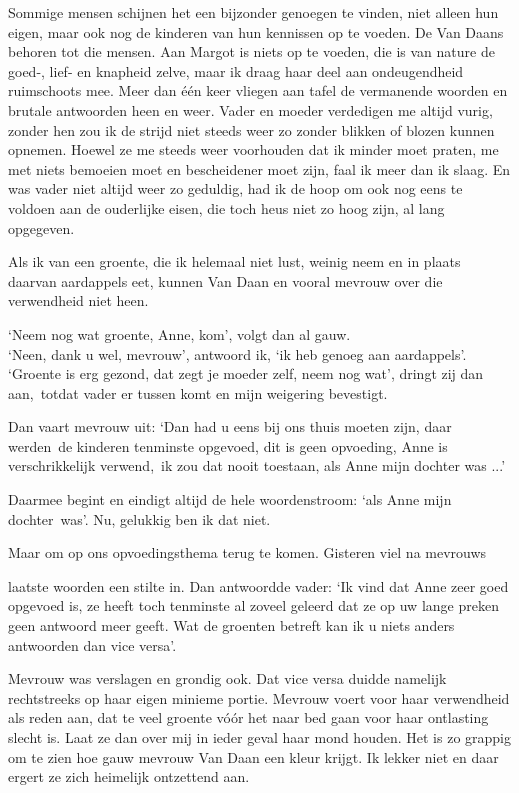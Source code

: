 \documentclass{book}
\begin{document}
Sommige mensen schijnen het een bijzonder genoegen te vinden, niet
alleen hun eigen, maar ook nog de kinderen van hun kennissen op te
voeden. De Van Daans behoren tot die mensen. Aan Margot is niets op te
voeden, die is van nature de goed-, lief- en knapheid zelve, maar ik
draag haar deel aan ondeugendheid ruimschoots mee. Meer dan één keer
vliegen aan tafel de vermanende woorden en brutale antwoorden heen en
weer. Vader en moeder verdedigen me altijd vurig, zonder hen zou ik de
strijd niet steeds weer zo zonder blikken of blozen kunnen opnemen.
Hoewel ze me steeds weer voorhouden dat ik minder moet praten, me met
niets bemoeien moet en bescheidener moet zijn, faal ik meer dan ik
slaag. En was vader niet altijd weer zo geduldig, had ik de hoop om ook
nog eens te voldoen aan de ouderlijke eisen, die toch heus niet zo hoog
zijn, al lang opgegeven.

Als ik van een groente, die ik helemaal niet lust, weinig neem en in
plaats daarvan aardappels eet, kunnen Van Daan en vooral mevrouw over
die verwendheid niet heen.

`Neem nog wat groente, Anne, kom', volgt dan al gauw.\\`Neen, dank u
wel, mevrouw', antwoord ik, `ik heb genoeg aan aardappels'. `Groente is
erg gezond, dat zegt je moeder zelf, neem nog wat', dringt zij dan
aan,~totdat vader er tussen komt en mijn weigering bevestigt.

Dan vaart mevrouw uit: `Dan had u eens bij ons thuis moeten zijn, daar
werden~de kinderen tenminste opgevoed, dit is geen opvoeding, Anne is
verschrikkelijk verwend,~ik zou dat nooit toestaan, als Anne mijn
dochter was ...'

Daarmee begint en eindigt altijd de hele woordenstroom: `als Anne mijn
dochter~was'. Nu, gelukkig ben ik dat niet.

Maar om op ons opvoedingsthema terug te komen. Gisteren viel na mevrouws

laatste woorden een stilte in. Dan antwoordde vader: `Ik vind dat Anne
zeer goed opgevoed is, ze heeft toch tenminste al zoveel geleerd dat ze
op uw lange preken geen antwoord meer geeft. Wat de groenten betreft kan
ik u niets anders antwoorden dan vice versa'.

Mevrouw was verslagen en grondig ook. Dat vice versa duidde namelijk
rechtstreeks op haar eigen minieme portie. Mevrouw voert voor haar
verwendheid als reden aan, dat te veel groente vóór het naar bed gaan
voor haar ontlasting slecht is. Laat ze dan over mij in ieder geval haar
mond houden. Het is zo grappig om te zien hoe gauw mevrouw Van Daan een
kleur krijgt. Ik lekker niet en daar ergert ze zich heimelijk ontzettend
aan.
\end{document}
